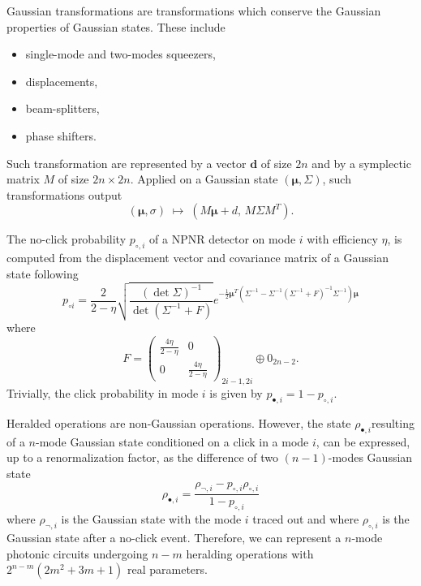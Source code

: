 Gaussian transformations are transformations which conserve the Gaussian properties of Gaussian states. 
These include
\begin{itemize}
	\item single-mode and two-modes squeezers,
	\item displacements,
	\item beam-splitters,
	\item phase shifters.
\end{itemize}
Such transformation are represented by a vector $\mathbf{d}$ of size $2n$ and by a symplectic matrix $M$ of size $2n\times2n$.
Applied on a Gaussian state $(\mathbf{\mu},\Sigma)$, such transformations output
\begin{equation}
	(\mathbf{\mu},\sigma)\; \mapsto\; (M\mathbf{\mu} + d,\, M\Sigma M^T).
\end{equation}

The no-click probability $p_{\circ,i}$ of a NPNR detector on mode $i$ with efficiency $\eta$, is computed from the displacement vector and covariance matrix of a Gaussian state following
\begin{equation}
p_{\circ i} =\frac{2}{2-\eta}\sqrt{\frac{(\det \Sigma)^{-1}}{ \det(\Sigma^{-1}+F)}}
e^{-\frac{1}{2}{\mathbf{\mu} }^T\left( \Sigma^{-1} - \Sigma^{-1} (\Sigma^{-1}+F)^{-1} \Sigma^{-1} \right){\mathbf{\mu} }}
\end{equation}
where
\begin{equation}
F= \left(\begin{array}{cc}
    \frac{4\eta}{2-\eta} & 0 \\
    0 & \frac{4\eta}{2-\eta}
    \end{array}\right)_{2i-1,2i} \oplus 0_{2n-2}.
\end{equation}
Trivially, the click probability in mode $i$ is given by $p_{\bullet,i}=1-p_{\circ,i}$.

Heralded operations are non-Gaussian operations.
However, the state $\rho_{\bullet,i}$resulting of a $n$-mode Gaussian state conditioned on a click in a mode $i$, can be expressed, up to a renormalization factor, as the difference of two $(n-1)$-modes Gaussian state
\begin{equation}
    \rho_{\bullet,i} = \frac{\rho_{\lnot,i} - p_{\circ,i} \rho_{\circ,i}}{1 - p_{\circ,i}}
\end{equation}
where $\rho_{\lnot,i}$ is the Gaussian state with the mode $i$ traced out and where $\rho_{\circ,i}$ is the Gaussian state after a no-click event.
Therefore, we can represent a $n$-mode photonic circuits undergoing $n-m$ heralding operations with $2^{n-m}(2m^2+3m+1)$ real parameters.

